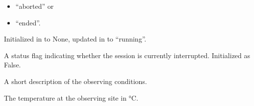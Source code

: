 \documentclass[letterpaper,10pt,english]{sphinxmanual}
\begin{document}
\begin{fulllineitems}
\begin{fulllineitems}
\begin{itemize}
\item {} 
\sphinxAtStartPar
“aborted” or

\item {} 
\sphinxAtStartPar
“ended”.

\end{itemize}

\sphinxAtStartPar
Initialized in  to None, updated in  to “running”.

\end{fulllineitems}


\begin{fulllineitems}
\label{\detokenize{autoapi/aop/aop/index:aop.aop.Session.interrupted}}
\pysigstartsignatures
{}
\pysigstopsignatures
\sphinxAtStartPar
A status flag indicating whether the session is currently interrupted.
Initialized as False.

\end{fulllineitems}


\begin{fulllineitems}
\label{\detokenize{autoapi/aop/aop/index:aop.aop.Session.conditionDescription}}
\pysigstartsignatures
{}
\pysigstopsignatures
\sphinxAtStartPar
A short description of the observing conditions.

\end{fulllineitems}


\begin{fulllineitems}
\label{\detokenize{autoapi/aop/aop/index:aop.aop.Session.temp}}
\pysigstartsignatures
{}
\pysigstopsignatures
\sphinxAtStartPar
The temperature at the observing site in °C.

\end{fulllineitems}



\end{fulllineitems}
\end{document}
